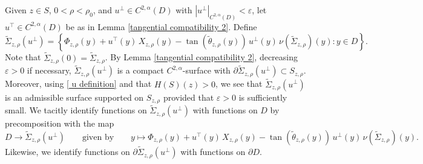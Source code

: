 \documentclass[11pt]{amsart}
\begin{document}
Given $z\in S$, $0<\rho<\rho_0$, and $u^\perp\in C^{2,\alpha}(D)$ with $|u^\perp|_{C^{2,\alpha}(D)}<\varepsilon$, let $u^\top \in C^{2,\alpha}(D)$ be as in Lemma \ref{tangential compatibility 2}. Define
$$
\tilde \Sigma_{z,\rho}(u^\perp)=\left\{ \Phi_{z,\rho}(y)+u^\top(y)\, X_{z,\rho}(y)-\tan(\tilde \theta_{z,\rho}(y))\,u^\perp(y)\,\nu(\tilde \Sigma_{z,\rho})(y):y\in D\right\}.
$$
Note that $\tilde \Sigma_{z,\rho}(0)=\tilde \Sigma_{z,\rho}$. By Lemma \ref{tangential compatibility 2}, decreasing $\varepsilon>0$ if necessary,  $\tilde \Sigma_{z,\rho}(u^\perp)$ is a compact $C^{2,\alpha}$-surface with $\partial \tilde \Sigma_{z,\rho}(u^\perp)\subset S_{z,\rho}$. Moreover, using \eqref{ u definition} and that $H(S)(z)>0$, we see that $\tilde \Sigma_{z,\rho}(u^\perp)$ is an admissible surface supported on $S_{z,\rho}$ provided that $\varepsilon>0$ is sufficiently small. We tacitly identify functions  on $\tilde \Sigma_{z,\rho}(u^\perp)$ with functions  on $D$ by precomposition with the map 
$$
D\to \tilde \Sigma_{z,\rho}(u^\perp)\qquad\text{given by}\qquad y\mapsto   \Phi_{z,\rho}(y)+u^\top(y)\, X_{z,\rho}(y)-\tan(\tilde \theta_{z,\rho}(y))\,u^\perp(y)\,\nu(\tilde \Sigma_{z,\rho})(y).
$$
Likewise, we identify functions on $\partial \tilde \Sigma_{z,\rho}(u^\perp)$ with functions on $\partial D$. 
\end{document}

